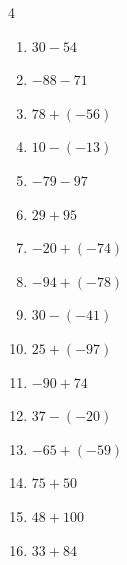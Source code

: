 \begin{multicols}{4}
\begin{enumerate}
        \phantom{$=63$}

  \item $30-54$

        \phantom{$=-24$}

  \item $-88-71$

        \phantom{$=-159$}

  \item $78+(-56)$

        \phantom{$=22$}

  \item $10-(-13)$

        \phantom{$=23$}

  \item $-79-97$

        \phantom{$=-176$}

  \item $29+95$

        \phantom{$=124$}

  \item $-20+(-74)$

        \phantom{$=-94$}

  \item $-94+(-78)$

        \phantom{$=-172$}

  \item $30-(-41)$

        \phantom{$=71$}

  \item $25+(-97)$

        \phantom{$=-72$}

  \item $-90+74$

        \phantom{$=-16$}

  \item $37-(-20)$

        \phantom{$=57$}

  \item $-65+(-59)$

        \phantom{$=-124$}

  \item $75+50$

        \phantom{$=125$}

  \item $48+100$

        \phantom{$=148$}

  \item $33+84$


\end{enumerate}
\end{multicols}
